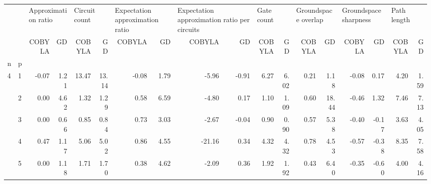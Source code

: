 \begin{tabular}{llrrrrrrrrrrrrrrrr}
\toprule
  &   & \multicolumn{2}{l}{Approximation ratio} & \multicolumn{2}{l}{Circuit count} & \multicolumn{2}{l}{Expectation approximation ratio} & \multicolumn{2}{l}{Expectation approximation ratio per circuits} & \multicolumn{2}{l}{Gate count} & \multicolumn{2}{l}{Groundspace overlap} & \multicolumn{2}{l}{Groundspace sharpness} & \multicolumn{2}{l}{Path length} \\
  &   &              COBYLA &    GD &        COBYLA &     GD &                          COBYLA &    GD &                                       COBYLA &    GD &     COBYLA &    GD &              COBYLA &     GD &                COBYLA &    GD &      COBYLA &    GD \\
n & p &                     &       &               &        &                                 &       &                                              &       &            &       &                     &        &                       &       &             &       \\
\midrule
4 & 1 &               -0.07 &  1.21 &         13.47 &  13.14 &                           -0.08 &  1.79 &                                        -5.96 & -0.91 &       6.27 &  6.02 &                0.21 &   1.18 &                 -0.08 &  0.17 &        4.20 &  1.59 \\
  & 2 &                0.00 &  4.62 &          1.32 &   1.29 &                            0.58 &  6.59 &                                        -4.80 &  0.17 &       1.10 &  1.09 &                0.60 &  18.44 &                 -0.46 &  1.32 &        7.46 &  7.13 \\
  & 3 &                0.00 &  0.66 &          0.85 &   0.84 &                            0.73 &  3.03 &                                        -2.67 & -0.04 &       0.90 &  0.90 &                0.57 &   5.38 &                 -0.40 & -0.17 &        3.63 &  4.05 \\
  & 4 &                0.47 &  1.17 &          5.06 &   5.02 &                            0.86 &  4.55 &                                       -21.16 &  0.34 &       4.32 &  4.32 &                0.78 &   4.53 &                 -0.57 & -0.38 &        8.35 &  7.58 \\
  & 5 &                0.00 &  1.18 &          1.71 &   1.70 &                            0.38 &  4.62 &                                        -2.09 &  0.36 &       1.92 &  1.92 &                0.43 &   6.40 &                 -0.35 & -0.60 &        4.00 &  4.16 \\

\end{tabular}
